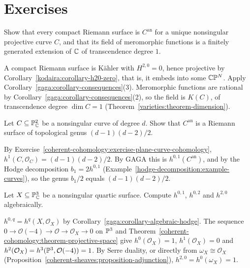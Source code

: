\section{Exercises}\label{gaga:section-exercises}

\begin{exercise}\label{gaga:exercise-riemann-surfaces-algebraic}
Show that every compact Riemann surface is $C^{\mathrm{an}}$ for a unique nonsingular projective curve $C$, and that its field of meromorphic functions is a finitely
generated extension of $\mathbb{C}$ of transcendence degree $1$.
\end{exercise}

\begin{solution}
A compact Riemann surface is K\"ahler with $H^{2,0} = 0$, hence projective by Corollary~\ref{kodaira:corollary-h20-zero}, that is, it embeds into some $\mathbb{C}\mathbb{P}^N$.
Apply Corollary~\ref{gaga:corollary-consequences}(3). Meromorphic functions are rational by Corollary~\ref{gaga:corollary-consequences}(2), so the field is $K(C)$, of
transcendence degree $\dim C = 1$ (Theorem~\ref{varieties:theorem-dimension}).
\end{solution}

\begin{exercise}\label{gaga:exercise-genus-plane-curve}
Let $C \subseteq \mathbb{P}^2_{\mathbb{C}}$ be a nonsingular curve of degree $d$. Show that $C^{\mathrm{an}}$ is a Riemann surface of topological genus $(d-1)(d-2)/2$.
\end{exercise}

\begin{solution}
By Exercise~\ref{coherent-cohomology:exercise-plane-curve-cohomology}, $h^1(C, \mathcal{O}_C) = (d-1)(d-2)/2$. By GAGA this is $h^{0,1}(C^{\mathrm{an}})$, and by the Hodge
decomposition $b_1 = 2h^{0,1}$ (Example~\ref{hodge-decomposition:example-curves}), so the genus $b_1/2$ equals $(d-1)(d-2)/2$.
\end{solution}

\begin{exercise}\label{gaga:exercise-hodge-numbers-hypersurface}
Let $X \subseteq \mathbb{P}^3_{\mathbb{C}}$ be a nonsingular quartic surface. Compute $h^{0,1}$, $h^{0,2}$ and $h^{2,0}$ algebraically.
\end{exercise}

\begin{solution}
$h^{0,q} = h^q(X, \mathcal{O}_X)$ by Corollary~\ref{gaga:corollary-algebraic-hodge}. The sequence $0 \to \mathcal{O}(-4) \to \mathcal{O} \to \mathcal{O}_X \to 0$ on $\mathbb{P}^3$ and
Theorem~\ref{coherent-cohomology:theorem-projective-space} give $h^0(\mathcal{O}_X) = 1$, $h^1(\mathcal{O}_X) = 0$ and $h^2(\mathcal{O}_X) = h^3(\mathbb{P}^3, \mathcal{O}(-4)) = 1$. By
Serre duality, or directly from $\omega_X \cong \mathcal{O}_X$ (Proposition~\ref{coherent-sheaves:proposition-adjunction}), $h^{2,0} = h^0(\omega_X) = 1$.
\end{solution}
